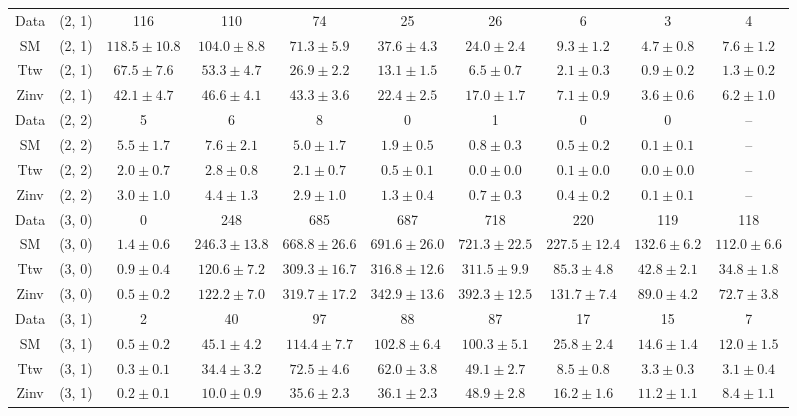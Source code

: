 \begin{table}[h!]
{\begin{tabular}{cccccccccc}
	Data & (2, 1) & 116 & 110 & 74 & 25 & 26 & 6 & 3 & 4 \\[0.5ex] 
	SM & (2, 1) & $118.5\pm 10.8$ & $104.0\pm 8.8$ & $71.3\pm 5.9$ & $37.6\pm 4.3$ & $24.0\pm 2.4$ & $9.3\pm 1.2$ & $4.7\pm 0.8$ & $7.6\pm 1.2$ \\[0.5ex] 
	Ttw & (2, 1) & $67.5\pm 7.6$ & $53.3\pm 4.7$ & $26.9\pm 2.2$ & $13.1\pm 1.5$ & $6.5\pm 0.7$ & $2.1\pm 0.3$ & $0.9\pm 0.2$ & $1.3\pm 0.2$ \\[0.5ex] 
	Zinv & (2, 1) & $42.1\pm 4.7$ & $46.6\pm 4.1$ & $43.3\pm 3.6$ & $22.4\pm 2.5$ & $17.0\pm 1.7$ & $7.1\pm 0.9$ & $3.6\pm 0.6$ & $6.2\pm 1.0$ \\[0.5ex] 
	Data & (2, 2) & 5 & 6 & 8 & 0 & 1 & 0 & 0 & -- \\[0.5ex] 
	SM & (2, 2) & $5.5\pm 1.7$ & $7.6\pm 2.1$ & $5.0\pm 1.7$ & $1.9\pm 0.5$ & $0.8\pm 0.3$ & $0.5\pm 0.2$ & $0.1\pm 0.1$ & -- \\[0.5ex] 
	Ttw & (2, 2) & $2.0\pm 0.7$ & $2.8\pm 0.8$ & $2.1\pm 0.7$ & $0.5\pm 0.1$ & $0.0\pm 0.0$ & $0.1\pm 0.0$ & $0.0\pm 0.0$ & -- \\[0.5ex] 
	Zinv & (2, 2) & $3.0\pm 1.0$ & $4.4\pm 1.3$ & $2.9\pm 1.0$ & $1.3\pm 0.4$ & $0.7\pm 0.3$ & $0.4\pm 0.2$ & $0.1\pm 0.1$ & -- \\[0.5ex] 
	Data & (3, 0) & 0 & 248 & 685 & 687 & 718 & 220 & 119 & 118 \\[0.5ex] 
	SM & (3, 0) & $1.4\pm 0.6$ & $246.3\pm 13.8$ & $668.8\pm 26.6$ & $691.6\pm 26.0$ & $721.3\pm 22.5$ & $227.5\pm 12.4$ & $132.6\pm 6.2$ & $112.0\pm 6.6$ \\[0.5ex] 
	Ttw & (3, 0) & $0.9\pm 0.4$ & $120.6\pm 7.2$ & $309.3\pm 16.7$ & $316.8\pm 12.6$ & $311.5\pm 9.9$ & $85.3\pm 4.8$ & $42.8\pm 2.1$ & $34.8\pm 1.8$ \\[0.5ex] 
	Zinv & (3, 0) & $0.5\pm 0.2$ & $122.2\pm 7.0$ & $319.7\pm 17.2$ & $342.9\pm 13.6$ & $392.3\pm 12.5$ & $131.7\pm 7.4$ & $89.0\pm 4.2$ & $72.7\pm 3.8$ \\[0.5ex] 
	Data & (3, 1) & 2 & 40 & 97 & 88 & 87 & 17 & 15 & 7 \\[0.5ex] 
	SM & (3, 1) & $0.5\pm 0.2$ & $45.1\pm 4.2$ & $114.4\pm 7.7$ & $102.8\pm 6.4$ & $100.3\pm 5.1$ & $25.8\pm 2.4$ & $14.6\pm 1.4$ & $12.0\pm 1.5$ \\[0.5ex] 
	Ttw & (3, 1) & $0.3\pm 0.1$ & $34.4\pm 3.2$ & $72.5\pm 4.6$ & $62.0\pm 3.8$ & $49.1\pm 2.7$ & $8.5\pm 0.8$ & $3.3\pm 0.3$ & $3.1\pm 0.4$ \\[0.5ex] 
	Zinv & (3, 1) & $0.2\pm 0.1$ & $10.0\pm 0.9$ & $35.6\pm 2.3$ & $36.1\pm 2.3$ & $48.9\pm 2.8$ & $16.2\pm 1.6$ & $11.2\pm 1.1$ & $8.4\pm 1.1$ \\[0.5ex] 

\end{tabular}}
\end{table}
